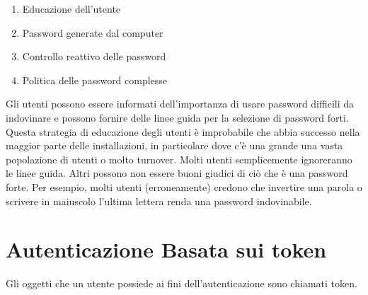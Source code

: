 \begin{enumerate}
    \item Educazione dell'utente
    \item Password generate dal computer
    \item Controllo reattivo delle password
    \item Politica delle password complesse
\end{enumerate}

\singlespacing
Gli utenti possono essere informati dell'importanza di usare password difficili da indovinare e possono fornire delle linee guida per la selezione di password forti. Questa strategia di educazione degli utenti è improbabile che abbia successo nella maggior parte delle installazioni, in particolare dove c'è una grande una vasta popolazione di utenti o molto turnover. Molti utenti semplicemente ignoreranno le linee guida. Altri possono non essere buoni giudici di ciò che è una password forte. Per esempio, molti utenti (erroneamente) credono che invertire una parola o scrivere in maiuscolo l'ultima lettera renda una password indovinabile.

\newpage
\section{Autenticazione Basata sui token}
Gli oggetti che un utente possiede ai fini dell'autenticazione sono chiamati token.


